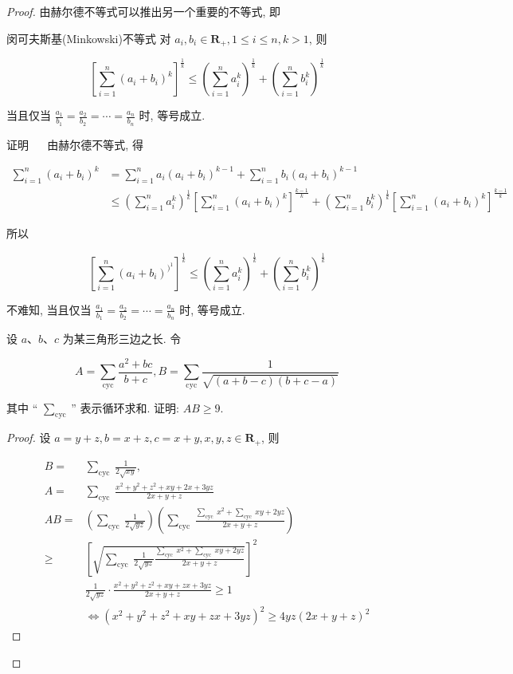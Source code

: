 \begin{proof}
	由赫尔德不等式可以推出另一个重要的不等式, 即
	
	闵可夫斯基(Minkowski)不等式 对 $a_{i}, b_{i} \in \mathbf{R}_{+}, 1 \leqslant i \leqslant n, k>1$, 则
	
	$$
	\left[\sum_{i=1}^{n}\left(a_{i}+b_{i}\right)^{k}\right]^{\frac{1}{k}} \leqslant\left(\sum_{i=1}^{n} a_{i}^{k}\right)^{\frac{1}{k}}+\left(\sum_{i=1}^{n} b_{i}^{k}\right)^{\frac{1}{k}}
	$$
	
	当且仅当 $\frac{a_{1}}{b_{1}}=\frac{a_{2}}{b_{2}}=\cdots=\frac{a_{n}}{b_{n}}$ 时, 等号成立.
	
	证明 $\quad$ 由赫尔德不等式, 得
	
	$$
	\begin{aligned}
	\sum_{i=1}^{n}\left(a_{i}+b_{i}\right)^{k} & =\sum_{i=1}^{n} a_{i}\left(a_{i}+b_{i}\right)^{k-1}+\sum_{i=1}^{n} b_{i}\left(a_{i}+b_{i}\right)^{k-1} \\
	& \leqslant\left(\sum_{i=1}^{n} a_{i}^{k}\right)^{\frac{1}{k}}\left[\sum_{i=1}^{n}\left(a_{i}+b_{i}\right)^{k}\right]^{\frac{k-1}{k}}+\left(\sum_{i=1}^{n} b_{i}^{k}\right)^{\frac{1}{k}}\left[\sum_{i=1}^{n}\left(a_{i}+b_{i}\right)^{k}\right]^{\frac{k-1}{k}}
	\end{aligned}
	$$
	
	所以
	
	$$
	\left[\sum_{i=1}^{n}\left(a_{i}+b_{i}\right)^{)^{1}}\right]^{\frac{1}{k}} \leqslant\left(\sum_{i=1}^{n} a_{i}^{k}\right)^{\frac{1}{k}}+\left(\sum_{i=1}^{n} b_{i}^{k}\right)^{\frac{1}{k}}
	$$
	
	不难知, 当且仅当 $\frac{a_{1}}{b_{1}}=\frac{a_{2}}{b_{2}}=\cdots=\frac{a_{n}}{b_{n}}$ 时, 等号成立.

\begin{example}
	设 $a 、 b 、 c$ 为某三角形三边之长. 令
	
	$$
	A=\sum_{\mathrm{cyc}} \frac{a^{2}+b c}{b+c}, B=\sum_{\mathrm{cyc}} \frac{1}{\sqrt{(a+b-c)(b+c-a)}}
	$$
	
	其中 “ $\sum_{\text {cyc }} ”$ 表示循环求和. 证明: $A B \geqslant 9$.
\end{example}
\begin{proof}
	设 $a=y+z, b=x+z, c=x+y, x, y, z \in \mathbf{R}_{+}$, 则
	
	$$
	\begin{aligned}
	B= & \sum_{\text {cyc }} \frac{1}{2 \sqrt{x y}}, \\
	A= & \sum_{\text {cyc }} \frac{x^{2}+y^{2}+z^{2}+x y+2 x+3 y z}{2 x+y+z} \\
	A B= & \left(\sum_{\text {cyc }} \frac{1}{2 \sqrt{y z}}\right)\left(\sum_{\text {cyc }} \frac{\sum_{\text {cyc }} x^{2}+\sum_{\text {cyc }} x y+2 y z}{2 x+y+z}\right) \\
	\geqslant & {\left[\sqrt{\sum_{\text {cyc }} \frac{1}{2 \sqrt{y z}} \frac{\sum_{\text {cyc }} x^{2}+\sum_{\text {cyc }} x y+2 y z}{2 x+y+z}}\right]^{2} } \\
	& \frac{1}{2 \sqrt{y z}} \cdot \frac{x^{2}+y^{2}+z^{2}+x y+z x+3 y z}{2 x+y+z} \geqslant 1 \\
	& \Leftrightarrow\left(x^{2}+y^{2}+z^{2}+x y+z x+3 y z\right)^{2} \geqslant 4 y z(2 x+y+z)^{2}
	\end{aligned}
	$$
	

\end{proof}
\end{proof}
